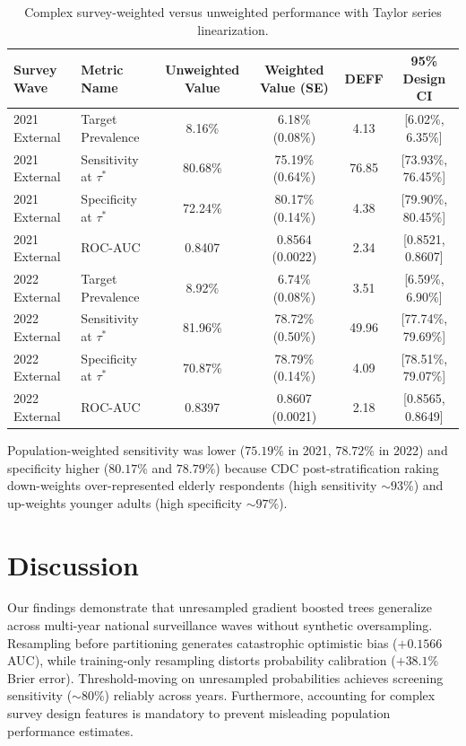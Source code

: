 \documentclass[11pt,a4paper]{article}
\begin{document}
\begin{table}[htbp]
\centering
\small
\caption{Complex survey-weighted versus unweighted performance with Taylor series linearization.}
\label{tab:weighted}
\begin{tabular}{llcccc}
\toprule
Survey Wave & Metric Name & Unweighted Value & Weighted Value (SE) & DEFF & 95\% Design CI \\
\midrule
2021 External & Target Prevalence & 8.16\% & 6.18\% (0.08\%) & 4.13 & [6.02\%, 6.35\%] \\
2021 External & Sensitivity at $\tau^*$ & 80.68\% & 75.19\% (0.64\%) & 76.85 & [73.93\%, 76.45\%] \\
2021 External & Specificity at $\tau^*$ & 72.24\% & 80.17\% (0.14\%) & 4.38 & [79.90\%, 80.45\%] \\
2021 External & ROC-AUC & 0.8407 & 0.8564 (0.0022) & 2.34 & [0.8521, 0.8607] \\
\midrule
2022 External & Target Prevalence & 8.92\% & 6.74\% (0.08\%) & 3.51 & [6.59\%, 6.90\%] \\
2022 External & Sensitivity at $\tau^*$ & 81.96\% & 78.72\% (0.50\%) & 49.96 & [77.74\%, 79.69\%] \\
2022 External & Specificity at $\tau^*$ & 70.87\% & 78.79\% (0.14\%) & 4.09 & [78.51\%, 79.07\%] \\
2022 External & ROC-AUC & 0.8397 & 0.8607 (0.0021) & 2.18 & [0.8565, 0.8649] \\
\bottomrule
\end{tabular}
\end{table}

Population-weighted sensitivity was lower ($75.19\%$ in 2021, $78.72\%$ in 2022) and specificity higher ($80.17\%$ and $78.79\%$) because CDC post-stratification raking down-weights over-represented elderly respondents (high sensitivity $\sim 93\%$) and up-weights younger adults (high specificity $\sim 97\%$).

\section{Discussion}
Our findings demonstrate that unresampled gradient boosted trees generalize across multi-year national surveillance waves without synthetic oversampling. Resampling before partitioning generates catastrophic optimistic bias ($+0.1566$ AUC), while training-only resampling distorts probability calibration ($+38.1\%$ Brier error). Threshold-moving on unresampled probabilities achieves screening sensitivity ($\sim 80\%$) reliably across years. Furthermore, accounting for complex survey design features is mandatory to prevent misleading population performance estimates.
\end{document}
